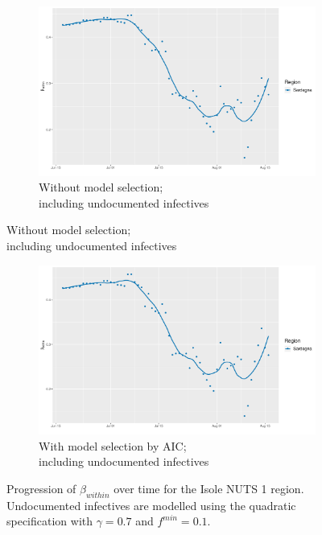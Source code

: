 \documentclass[12pt]{article}
\begin{document}
\begin{appendices}
\begin{figure}[H]
    	\end{figure}
        \begin{figure}[H]\ContinuedFloat
    	    \begin{subfigure}{\textwidth}
    	      \centering
    	      \includegraphics[width=0.94\linewidth]{output/model_within_lag14_betawithin_Isole_UndocQuadratic_rolling.pdf}
    	      \caption{Without model selection; \\ including undocumented infectives}
    	      \label{fig:beta_within_over_time_isole_regular_undoc}
    	    \end{subfigure}\newline
        \end{figure}
        \begin{figure}[H]\ContinuedFloat
    	    \begin{subfigure}{\textwidth}
    	      \centering
    	      \includegraphics[width=0.94\linewidth]{output/model_within_lag14_betawithin_Isole_aic_UndocQuadratic_rolling.pdf}
    	      \caption{With model selection by AIC; \\ including undocumented infectives}
    	      \label{fig:beta_within_over_time_isole_aic_undoc}
    	    \end{subfigure}
    	    \caption{Progression of $\beta_{within}$ over time for the Isole NUTS 1 region. Undocumented infectives are modelled using the quadratic specification with $\gamma = 0.7$ and $f^{min}=0.1$.}
    	    \label{fig:beta_within_over_time_isole}
	    \end{figure}
		

\end{appendices}
\end{document}
